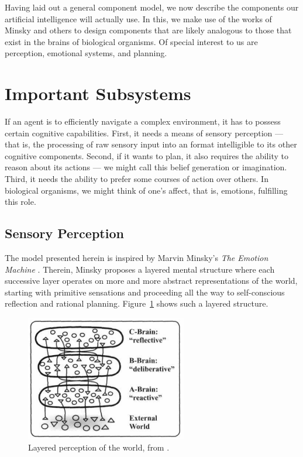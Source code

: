 Having laid out a general component model, we now describe the components our artificial intelligence will actually use. In this, we make use of the works of Minsky and others to design components that are likely analogous to those that exist in the brains of biological organisms. Of special interest to us are perception, emotional systems, and planning. 

\section{Important Subsystems}\label{sec:someImportantSubsystems}

If an agent is to efficiently navigate a complex environment, it has to possess certain cognitive capabilities. First, it needs a means of sensory perception --- that is, the processing of raw sensory input into an format intelligible to its other cognitive components. Second, if it wants to plan, it also requires the ability to reason about its actions --- we might call this belief generation or imagination. Third, it needs the ability to prefer some courses of action over others. In biological organisms, we might think of one's affect, that is, emotions, fulfilling this role.

\subsection{Sensory Perception}\label{sec:sensoryPerception}

The model presented herein is inspired by Marvin Minsky's \emph{The Emotion Machine} \cite{emotionMachine}. Therein, Minsky proposes a layered mental structure where each successive layer operates on more and more abstract representations of the world, starting with primitive sensations and proceeding all the way to self-conscious reflection and rational planning. Figure~\ref{fig:brainLayers} shows such a layered structure.

 \begin{figure}[t]
 	\centering
 	\includegraphics[width=200pt]{Figs/emotionMachine_brainLayers.png}
 	\caption{Layered perception of the world, from \cite[p.\ 100]{emotionMachine}.}
 	\label{fig:brainLayers}
 \end{figure}
 
